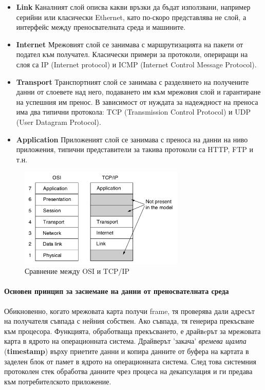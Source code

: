 \documentclass[12pt,a4paper,oneside]{book}
\begin{document}
\begin{itemize}
  \item \textbf{Link} Каналният слой описва какви връзки да бъдат използвани,
    например серийни или класически Ethernet, като по-скоро представлява не
    слой, а интерфейс между преносвателната среда и машините.
  \item \textbf{Internet} Мрежовият слой се занимава с маршрутизацията на
    пакети от подател към получател. Класически примери за протоколи, опериращи
    на слоя са IP (Internet protocol) и ICMP (Internet Control Message Protocol).
  \item \textbf{Transport} Транспортният слой се занимава с разделянето на
    получените данни от слоевете над него, подаването им към
    мрежовия слой и гарантиране на успешния им пренос. В зависимост от нуждата
    за надеждност на преноса има два типични протокола: TCP (Transmission
    Control Protocol) и UDP (User Datagram Protocol).
  \item \textbf{Application} Приложеният слой се занимава с преноса на данни на
    ниво приложения, типични представители за такива протоколи са HTTP, FTP и
    т.н.
\end{itemize}

\begin{figure}[h!]
  \centering
  \includegraphics[width=0.7\textwidth]{figures/osi_vs_tcp.png}
  \caption{Сравнение между OSI и TCP/IP}
  \label{osi_vs_tcp_Fig}
\end{figure}

\paragraph{Основен принцип за заснемане на данни от преносвателната среда}

Обикновенно, когато мрежовата карта получи frame, тя проверява дали адресът на
получателя съвпада с нейния собствен. Ако съвпада, тя генерира прекъсване към
процесора. Функцията, обработваща прекъсването, е драйвeрът за мрежовата
карта в ядрото на операционната система. Драйверът 'закача' \textit{времева
щампа}
(\textbf{timestamp}) върху приетите данни и копира данните от буфера на картата
в заделен блок от памет в ядрото на операционната система. След това системния
протоколен стек обработва данните чрез процеса на декапсулация и ги предава към
потребителското приложение.
\end{document}
